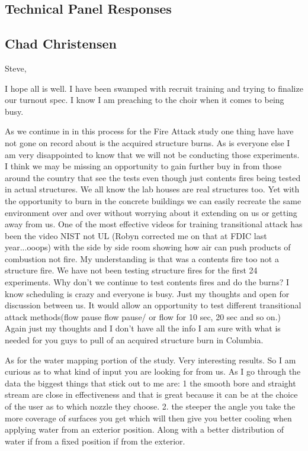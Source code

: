 \documentclass[12pt,oneside]{book}
\begin{document}
\begin{appendix}

\chapter*{Technical Panel Responses}
\label{panel_responses}

\section{Chad Christensen}

Steve,
 
I hope all is well.  I have been swamped with recruit training and trying to finalize our turnout spec. I know I am preaching to the choir when it comes to being busy.  
 
As we continue in in this process for the Fire Attack study one thing have have not gone on record about is the acquired structure burns.  As is everyone else I am very disappointed to know that we will not be conducting those experiments. I think we may be missing an opportunity to gain further buy in from those around the country that see the tests even though just contents fires being tested in actual structures.  We all know the lab houses are real structures too.  Yet with the opportunity to burn in the concrete buildings we can easily recreate the same environment over and over without worrying about it extending on us or getting away from us.  One of the most effective videos for training transitional attack  has been the video NIST not UL (Robyn corrected me on that at FDIC last year...ooops) with the side by side room showing how air can push products of combustion not fire. My understanding is that was a contents fire too not a structure fire.  We have not been testing structure fires for the first 24 experiments.  Why don't we continue to test contents fires and do the burns?  I know scheduling is crazy and everyone is busy. Just my thoughts and open for discussion between us.  It would allow an opportunity to test different transitional attack methods(flow pause flow pause/ or flow for 10 sec, 20 sec and so on.)  Again just my thoughts and I don't have all the info I am sure with what is needed for you guys to pull of an acquired structure burn in Columbia.   
 
As for the water mapping portion of the study.  Very interesting results.  So I am curious as to what kind of input you are looking for from us.  As I go through the data the biggest things that stick out to me are: 
1 the smooth bore and straight stream are close in effectiveness and that is great because it can be at the choice of the user as to which nozzle they choose. 
2. the steeper the angle you take the more coverage of surfaces you get which will then give you better cooling when applying water from an exterior position.  Along with a better distribution of water if from a fixed position if from the exterior.  
 

\end{appendix}
\end{document}
